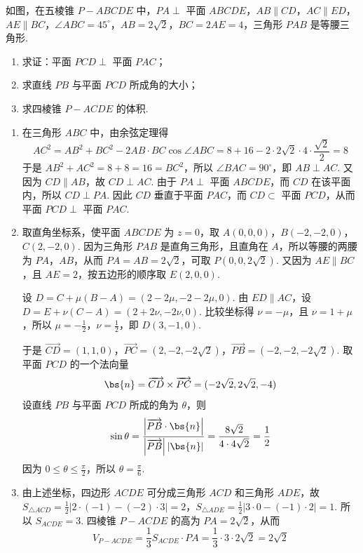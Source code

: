 \begin{problem}
如图，在五棱锥 \(P - ABCDE\) 中，\(PA \perp\) 平面 \(ABCDE\)，\(AB \parallel CD\)，\(AC \parallel ED\)，\(AE \parallel BC\)，\(\angle ABC = 45^\circ\)，\(AB = 2\sqrt{2}\)，\(BC = 2AE = 4\)，三角形 \(PAB\) 是等腰三角形.
\begin{enumerate}
\item 求证：平面 \(PCD \perp\) 平面 \(PAC\)；
\item 求直线 \(PB\) 与平面 \(PCD\) 所成角的大小；
\item 求四棱锥 \(P - ACDE\) 的体积.
\end{enumerate}

\end{problem}

\begin{solution}
\begin{enumerate}
\item 在三角形 \(ABC\) 中，由余弦定理得
\[
AC^2=AB^2+BC^2-2AB\cdot BC\cos\angle ABC=8+16-2\cdot2\sqrt2\cdot4\cdot\frac{\sqrt2}{2}=8
\]
于是 \(AB^2+AC^2=8+8=16=BC^2\)，所以 \(\angle BAC=90^\circ\)，即 \(AB\perp AC\). 又因为 \(CD\parallel AB\)，故 \(CD\perp AC\). 由于 \(PA\perp\) 平面 \(ABCDE\)，而 \(CD\) 在该平面内，所以 \(CD\perp PA\). 因此 \(CD\) 垂直于平面 \(PAC\)，而 \(CD\subset\) 平面 \(PCD\)，从而平面 \(PCD\perp\) 平面 \(PAC\).
\item 取直角坐标系，使平面 \(ABCDE\) 为 \(z=0\)，取
\(A(0,0,0)\)，\(B(-2,-2,0)\)，\(C(2,-2,0)\).
因为三角形 \(PAB\) 是直角三角形，且直角在 \(A\)，所以等腰的两腰为 \(PA\)，\(AB\)，从而 \(PA=AB=2\sqrt2\)，可取 \(P(0,0,2\sqrt2)\). 又因为 \(AE\parallel BC\)，且 \(AE=2\)，按五边形的顺序取 \(E(2,0,0)\).

设 \(D=C+\mu(B-A)=\left(2-2\mu,-2-2\mu,0\right)\). 由 \(ED\parallel AC\)，设 \(D=E+\nu(C-A)=\left(2+2\nu,-2\nu,0\right)\). 比较坐标得 \(\nu=-\mu\)，且 \(\nu=1+\mu\)，所以 \(\mu=-\frac12\)，\(\nu=\frac12\)，即 \(D(3,-1,0)\).

于是
\(\overrightarrow{CD}=(1,1,0)\)，\(\overrightarrow{PC}=(2,-2,-2\sqrt2)\)，\(\overrightarrow{PB}=(-2,-2,-2\sqrt2)\).
取平面 \(PCD\) 的一个法向量
\[
\bs{n}=\overrightarrow{CD}\times\overrightarrow{PC}=(-2\sqrt2,2\sqrt2,-4)
\]
设直线 \(PB\) 与平面 \(PCD\) 所成的角为 \(\theta\)，则
\[
\sin\theta=\frac{\left|\overrightarrow{PB}\cdot\bs{n}\right|}{\left|\overrightarrow{PB}\right|\left|\bs{n}\right|}=\frac{8\sqrt2}{4\cdot4\sqrt2}=\frac12
\]
因为 \(0\leqslant\theta\leqslant\frac\pi2\)，所以 \(\theta=\frac\pi6\).
\item 由上述坐标，四边形 \(ACDE\) 可分成三角形 \(ACD\) 和三角形 \(ADE\)，故
\(S_{\triangle ACD}=\frac12\left|2\cdot(-1)-(-2)\cdot3\right|=2\)，\(S_{\triangle ADE}=\frac12\left|3\cdot0-(-1)\cdot2\right|=1\).
所以 \(S_{ACDE}=3\). 四棱锥 \(P-ACDE\) 的高为 \(PA=2\sqrt2\)，从而
\[
V_{P-ACDE}=\frac13S_{ACDE}\cdot PA=\frac13\cdot3\cdot2\sqrt2=2\sqrt2
\]
\end{enumerate}
\end{solution}

